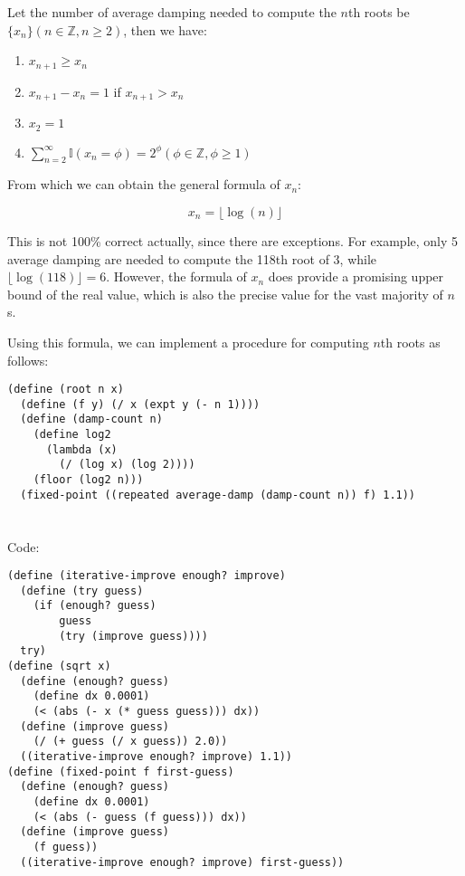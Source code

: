 \documentclass[../main.tex]{subfiles}
\begin{document}
Let the number of average damping needed to
 compute the $n$th roots be
 $\{x_n\}(n\in\mathbb{Z},n\geq2)$, then we have:

\begin{enumerate}
\item $x_{n+1}\geq x_n$
\item $x_{n+1}-x_n=1$ if $x_{n+1}>x_n$
\item $x_2 = 1$
\item $\sum_{n=2}^\infty\mathbb{I}(x_n=\phi)=2^\phi(\phi\in\mathbb{Z},\phi\geq1)$
\end{enumerate}

From which we can obtain the general formula of $x_n$:

$$
x_n = \lfloor\log(n)\rfloor
$$

This is not 100\% correct actually, since there are
 exceptions. For example, only 5 average damping are
 needed to compute the 118th root of 3, while
 $\lfloor\log(118)\rfloor=6$. However, the formula
 of $x_n$ does provide a promising upper bound of
 the real value, which is also the precise value for
 the vast majority of $n$s.

Using this formula, we can implement a procedure for computing
 $n$th roots as follows:

\begin{lstlisting}
(define (root n x)
  (define (f y) (/ x (expt y (- n 1))))
  (define (damp-count n)
    (define log2
      (lambda (x)
        (/ (log x) (log 2))))
    (floor (log2 n)))
  (fixed-point ((repeated average-damp (damp-count n)) f) 1.1))
\end{lstlisting}


\section{}

Code:

\begin{lstlisting}
(define (iterative-improve enough? improve)
  (define (try guess)
    (if (enough? guess)
        guess
        (try (improve guess))))
  try)
(define (sqrt x)
  (define (enough? guess)
    (define dx 0.0001)
    (< (abs (- x (* guess guess))) dx))
  (define (improve guess)
    (/ (+ guess (/ x guess)) 2.0))
  ((iterative-improve enough? improve) 1.1))
(define (fixed-point f first-guess)
  (define (enough? guess)
    (define dx 0.0001)
    (< (abs (- guess (f guess))) dx))
  (define (improve guess)
    (f guess))
  ((iterative-improve enough? improve) first-guess))
\end{lstlisting}
\end{document}
